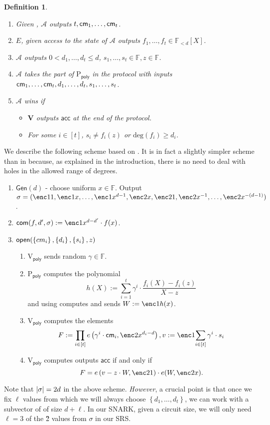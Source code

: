 \documentclass[11pt]{article}
\numberwithin{figure}{section} %
\newtheorem{dfn}[thm]{Definition}
\newcommand{\set}[1]{\ensuremath{\left\{#1\right\}}\xspace}
\newcommand{\F}{\ensuremath{\mathbb F}\xspace}
\newcommand{\adv}{\ensuremath{\mathcal A}\xspace}
\renewcommand{\deg}{\ensuremath{\mathrm{deg}}\xspace}
\newcommand{\acc}{\ensuremath{\mathsf{acc}}\xspace}
\newcommand{\defeq}{:=}
\newcommand{\gen}{\ensuremath{\mathsf{Gen}}\xspace}
\newcommand{\prvpoly}{\ensuremath{\mathrm{P_{\mathsf{poly}}}}\xspace}
\newcommand{\verpoly}{\ensuremath{\mathrm{V_{\mathsf{poly}}}}\xspace}
\newcommand{\ver}{\ensuremath{\mathsf{\mathbf{V}}}\xspace}
\newcommand{\ext}{\ensuremath{E}\xspace}
\newcommand{\polysofdeg}[1]{\ensuremath{\F_{< #1}[X]}\xspace}
\begin{document}
\begin{dfn}
\begin{itemize}
\begin{enumerate}
  \item Given \srs, \adv outputs $t,\mathsf{cm}_1,\ldots,\mathsf{cm}_t$.
  \item \ext, given access to the state of \adv outputs $f_1,\ldots,f_t \in \polysofdeg{d}$.
  \item \adv outputs $0< d_1,\ldots,d_t \leq d$, $s_1,\ldots,s_t \in \F,z \in \F$.
  \item \adv takes the part of \prvpoly in the protocol \open with inputs
  $\mathsf{cm}_1,\ldots,\mathsf{cm}_t,d_1,\ldots,d_t,s_1,\ldots,s_t$.
  \item $\adv$ wins if 
  \begin{itemize} 
   \item \ver outputs \acc at the end of the protocol.
   \item For some $i\in [t]$, $s_i\neq f_i(z)$ or $\deg(f_i)\geq d_i$.
  \end{itemize}

 \end{enumerate}

\end{itemize}
\end{dfn}
We describe the following scheme based on \cite{kate,sonic}.
It is in fact a slightly simpler scheme than in \cite{sonic} because, as explained in the introduction, there is no need to deal with holes in the allowed range of degrees.
\begin{enumerate}
 \item $\gen(d)$ - choose uniform $x\in \F$. Output $\srs =(\enc1{1},\enc1{x},\ldots,\enc1{x^{d-1}},\enc2{x},\enc2{1},\enc2{x^{-1}},\ldots,\enc2{x^{-(d-1)}})$.
 \item $\com(f,d',\srs) \defeq \enc1{x^{d-d'}\cdot f(x)}$.
 \item $\open(\set{cm_i},\set{d_i},\set{s_i},z)$
 \begin{enumerate}
  \item \verpoly sends random $\gamma\in \F$.
 \item \prvpoly computes the polynomial
 \[h(X)\defeq \sum_{i=1}^t \gamma^{i}\cdot \frac{f_i(X)-f_i(z)}{X-z}  \]
 and using \srs computes and sends $W\defeq \enc1{h(x)}$.
 \item\label{step:computeW} \verpoly computes the elements 
 \[F\defeq \prod_{i\in [t]}e\left(\gamma^{i} \cdot \cm_i, \enc2{x^{d_i-d}} \right), v\defeq \enc1{\sum_{i\in [t]} \gamma^{i}\cdot s_i}\]
 \item \verpoly computes outputs \acc if and only if
 \[ F= e\left(v- z\cdot W,\enc2{1}\right )\cdot e(W,\enc2{x} ). \]
 \end{enumerate}

\end{enumerate}
Note that $|\sigma| = 2d$ in the above scheme.
\emph{However}, a crucial point is that once we fix $\ell$ values from which we will always choose \set{d_1,\ldots,d_t},
we can work with a subvector of \srs of size $d+\ell$. In our SNARK, given a circuit size, we will only need $\ell=3$ of the \G2 values from $\sigma$ in our SRS.
\end{document}
